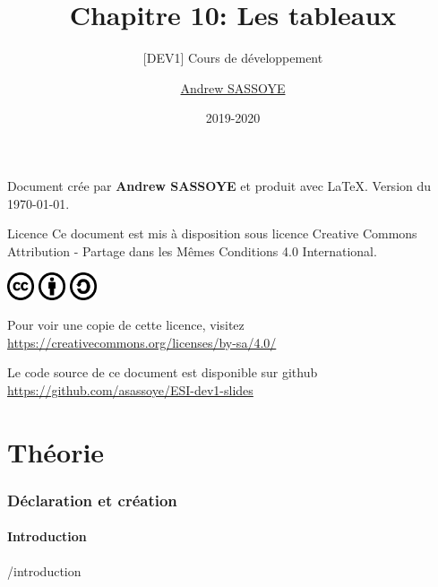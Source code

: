 \documentclass{beamer}
\title{Chapitre 10: Les tableaux}
\subtitle{\tiny [DEV1] Cours de développement}
\author{\href{https://andrew.sassoye.be}{Andrew SASSOYE}}
\date{2019-2020}
\begin{document}
	\begin{frame}
		\titlepage
	\end{frame}

	\begin{frame}
        \center Document crée par \textbf{Andrew SASSOYE} et produit avec \LaTeX.
        \tiny Version du \today. \normalsize

		\begin{block}{Licence}
            Ce document est mis à disposition sous licence Creative Commons
            Attribution - Partage dans les Mêmes Conditions 4.0 International.

            \begin{center}
                \includegraphics[width=8mm]{./styles/images/cc}
                \includegraphics[width=8mm]{./styles/images/by}
                \includegraphics[width=8mm]{./styles/images/sa}
            \end{center}

            \center\tiny Pour voir une copie de cette licence, visitez
            \href{https://creativecommons.org/licenses/by-sa/4.0/}{https://creativecommons.org/licenses/by-sa/4.0/}
            \normalsize
        \end{block}

        \tiny Le code source de ce document est disponible sur github\\ \href{https://github.com/asassoye/ESI-dev1-slides}{https://github.com/asassoye/ESI-dev1-slides}

    \end{frame}

    \part{Théorie}

    \section{Déclaration et création}\label{sec:declaration-et-creation}
        \subsection{Introduction}\label{subsec:introduction}
    {/introduction}
\end{document}
